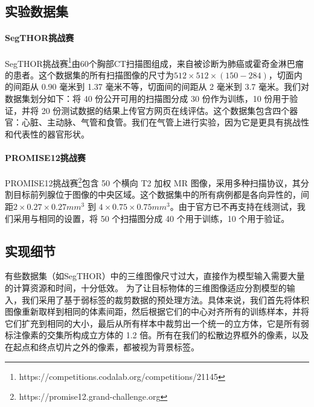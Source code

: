 \subsection{实验数据集} \label{sec:dataset}

\paragraph{SegTHOR挑战赛}
SegTHOR挑战赛\footnote{https://competitions.codalab.org/competitions/21145}\citep{trullo2019multiorgan}由60个胸部CT扫描图组成，来自被诊断为肺癌或霍奇金淋巴瘤的患者。这个数据集的所有扫描图像的尺寸为$512\times512\times(150-284)$，切面内的间距从 0.90 毫米到 1.37 毫米不等，切面间的间距从 2 毫米到 3.7 毫米。我们对数据集划分如下：将 40 份公开可用的扫描图分成 30 份作为训练，10 份用于验证，并将 20 份测试数据的结果上传官方网页在线评估。这个数据集包含四个器官：心脏、主动脉、气管和食管。我们在气管上进行实验，因为它是更具有挑战性和代表性的器官形状。


\paragraph{PROMISE12挑战赛}
PROMISE12挑战赛\footnote{https://promise12.grand-challenge.org}\citep{Litjens2014EvaluationOP}包含 50 个横向 T2 加权 MR 图像，采用多种扫描协议，其分割目标前列腺位于图像的中央区域。这个数据集中的所有病例都是各向异性的，间距$2\times0.27\times0.27 mm^{3}$ 到 $4\times0.75\times0.75 mm^{3}$。由于官方已不再支持在线测试，我们采用与\citet{kervadec2020bounding}相同的设置，将 50 个扫描图分成 40 个用于训练，10 个用于验证。

\subsection{实现细节} \label{sec:detail}

有些数据集（如SegTHOR）中的三维图像尺寸过大，直接作为模型输入需要大量的计算资源和时间，十分低效。
为了让目标物体的三维图像适应分割模型的输入，我们采用了基于弱标签的裁剪数据的预处理方法。具体来说，我们首先将体积图像重新取样到相同的体素间距，然后根据它们的中心对齐所有的训练样本，并将它们扩充到相同的大小，最后从所有样本中裁剪出一个统一的立方体，它是所有弱标注像素的交集所构成立方体的 1.2 倍。所有在我们的松散边界框外的像素，以及在起点和终点切片之外的像素，都被视为背景标签。


